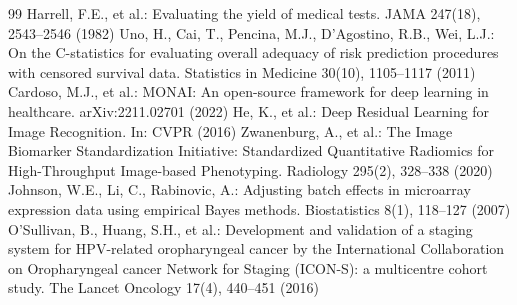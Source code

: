 \documentclass[runningheads]{llncs}
\begin{document}
\begin{thebibliography}{99}
 Harrell, F.E., et al.: Evaluating the yield of medical tests. JAMA 247(18), 2543--2546 (1982)
 Uno, H., Cai, T., Pencina, M.J., D'Agostino, R.B., Wei, L.J.: On the C-statistics for evaluating overall adequacy of risk prediction procedures with censored survival data. Statistics in Medicine 30(10), 1105--1117 (2011)
 Cardoso, M.J., et al.: MONAI: An open-source framework for deep learning in healthcare. arXiv:2211.02701 (2022)
 He, K., et al.: Deep Residual Learning for Image Recognition. In: CVPR (2016)
 Zwanenburg, A., et al.: The Image Biomarker Standardization Initiative: Standardized Quantitative Radiomics for High-Throughput Image-based Phenotyping. Radiology 295(2), 328--338 (2020)
 Johnson, W.E., Li, C., Rabinovic, A.: Adjusting batch effects in microarray expression data using empirical Bayes methods. Biostatistics 8(1), 118--127 (2007)
 O'Sullivan, B., Huang, S.H., et al.: Development and validation of a staging system for HPV-related oropharyngeal cancer by the International Collaboration on Oropharyngeal cancer Network for Staging (ICON-S): a multicentre cohort study. The Lancet Oncology 17(4), 440--451 (2016)
\end{thebibliography}
\end{document}
